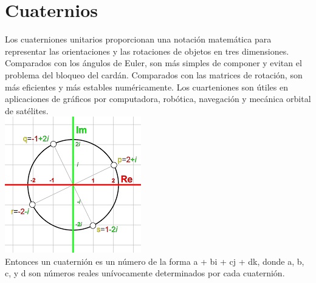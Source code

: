 \documentclass[12pt,a4paper]{article}
\begin{document}
\section{Cuaternios}
Los cuaterniones unitarios proporcionan una notación matemática para representar las orientaciones y las rotaciones de objetos en tres dimensiones. Comparados con los ángulos de Euler, son más simples de componer y evitan el problema del bloqueo del cardán. Comparados con las matrices de rotación, son más eficientes y más estables numéricamente. Los cuarteniones son útiles en aplicaciones de gráficos por computadora, robótica, navegación y mecánica orbital de satélites.\\
\includegraphics[scale=1]{imag6.png}\\
Entonces un cuaternión es un número de la forma a + bi + cj + dk, donde a, b, c, y d son números reales unívocamente determinados por cada cuaternión.\\
\end{document}

